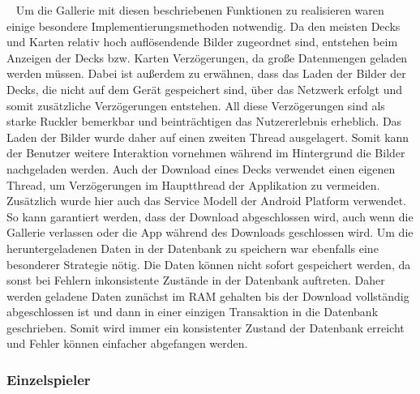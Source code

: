 \documentclass{scrartcl}
\begin{document}
\ \newline
Um die Gallerie mit diesen beschriebenen Funktionen zu
realisieren waren einige besondere Implementierungsmethoden notwendig. Da den
meisten Decks und Karten relativ hoch auflösendende Bilder zugeordnet sind,
entstehen beim Anzeigen der Decks bzw. Karten Verzögerungen, da große
Datenmengen geladen werden müssen. Dabei ist außerdem zu erwähnen, dass das
Laden der Bilder der Decks, die nicht auf dem Gerät gespeichert sind, über das
Netzwerk erfolgt und somit zusätzliche Verzögerungen entstehen. All diese
Verzögerungen sind als starke Ruckler bemerkbar und beinträchtigen das
Nutzererlebnis erheblich. Das Laden der Bilder wurde daher auf einen zweiten
Thread ausgelagert. Somit kann der Benutzer weitere Interaktion vornehmen
während im Hintergrund die Bilder nachgeladen werden. Auch der Download eines
Decks verwendet einen eigenen Thread, um Verzögerungen im Hauptthread der
Applikation zu vermeiden. Zusätzlich wurde hier auch das Service Modell der
Android Platform verwendet. So kann garantiert werden, dass der Download
abgeschlossen wird, auch wenn die Gallerie verlassen oder die App während des
Downloads geschlossen wird. Um die heruntergeladenen Daten in der Datenbank zu
speichern war ebenfalls eine besonderer Strategie nötig. Die Daten können nicht
sofort gespeichert werden, da sonst bei Fehlern inkonsistente Zustände in der
Datenbank auftreten. Daher werden geladene Daten zunächst im RAM gehalten
bis der Download vollständig abgeschlossen ist und dann in einer einzigen
Transaktion in die Datenbank geschrieben. Somit wird immer ein konsistenter
Zustand der Datenbank erreicht und Fehler können einfacher abgefangen werden.

\subsubsection{Einzelspieler}
\end{document}
